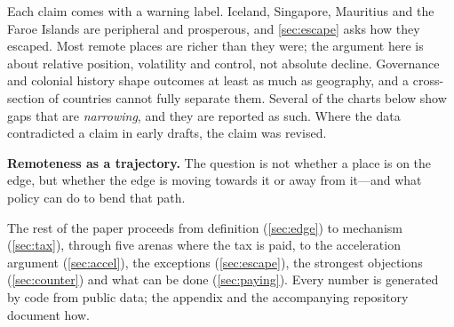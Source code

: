 Each claim comes with a warning label. Iceland, Singapore, Mauritius and the
Faroe Islands are peripheral and prosperous, and \cref{sec:escape} asks how
they escaped. Most remote places are richer than they were; the argument here
is about relative position, volatility and control, not absolute decline.
Governance and colonial history shape outcomes at least as much as geography,
and a cross-section of countries cannot fully separate them. Several of the
charts below show gaps that are \emph{narrowing}, and they are reported as
such. Where the data contradicted a claim in early drafts, the claim was
revised.

\begin{keyidea}
\textbf{Remoteness as a trajectory.} The question is not whether a place is
on the edge, but whether the edge is moving towards it or away from it---and
what policy can do to bend that path.
\end{keyidea}

The rest of the paper proceeds from definition (\cref{sec:edge}) to mechanism
(\cref{sec:tax}), through five arenas where the tax is paid, to the
acceleration argument (\cref{sec:accel}), the exceptions
(\cref{sec:escape}), the strongest objections (\cref{sec:counter}) and what
can be done (\cref{sec:paying}). Every number is generated by code from public
data; the appendix and the accompanying repository document how.
